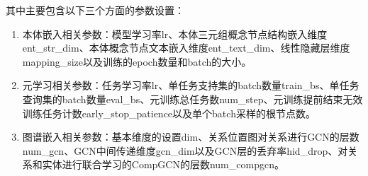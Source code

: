 其中主要包含以下三个方面的参数设置：
\begin{enumerate}[label=\arabic*)]
\item 本体嵌入相关参数：模型学习率lr、本体三元组概念节点结构嵌入维度ent\_str\_dim、本体概念节点文本嵌入维度ent\_text\_dim、线性隐藏层维度mapping\_size以及训练的epoch数量和batch的大小。
\item 元学习相关参数：任务学习率lr、单任务支持集的batch数量train\_bs、单任务查询集的batch数量eval\_bs、元训练总任务数num\_step、元训练提前结束无效训练任务计数early\_stop\_patience以及单个batch采样的根节点数。
\item 图谱嵌入相关参数：基本维度的设置dim、关系位置图对关系进行GCN的层数num\_gcn、GCN中间传递维度gcn\_dim以及GCN层的丢弃率hid\_drop、对关系和实体进行联合学习的CompGCN的层数num\_compgcn。
\end{enumerate}
